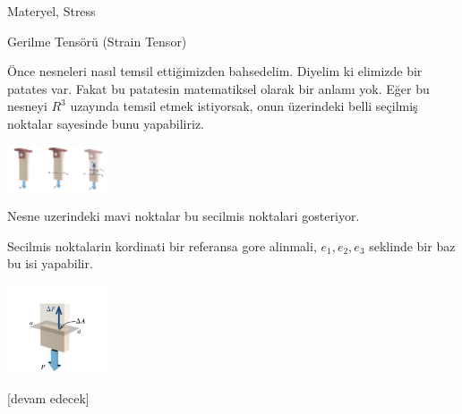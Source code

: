 \documentclass[12pt,fleqn]{article}\usepackage{../../common}
\begin{document}
Materyel, Stress

Gerilme Tensörü (Strain Tensor) 

Önce nesneleri nasıl temsil ettiğimizden bahsedelim. Diyelim ki elimizde bir
patates var. Fakat bu patatesin matematiksel olarak bir anlamı yok. Eğer
bu nesneyi $R^3$ uzayında temsil etmek istiyorsak, onun üzerindeki belli
seçilmiş noktalar sayesinde bunu yapabiliriz.

\includegraphics[width=8em]{phy_020_strs_01_01.jpg}

Nesne uzerindeki mavi noktalar bu secilmis noktalari gosteriyor.

Secilmis noktalarin kordinati bir referansa gore alinmali, $e_1,e_2,e_3$
seklinde bir baz bu isi yapabilir. 

\includegraphics[width=8em]{phy_020_strs_01_02.jpg}



















[devam edecek]
\end{document}

